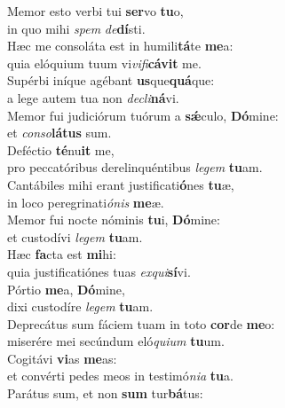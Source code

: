 \oddverse Memor esto verbi tui \textbf{ser}vo \textbf{tu}o,~\*\\
\oddverse in quo mihi \textit{spem} \textit{de}\textbf{dí}sti.\\
\evenverse Hæc me consoláta est in humili\textbf{tá}te \textbf{me}a:~\*\\
\evenverse quia elóquium tuum vi\textit{vi}\textit{fi}\textbf{cá}\textbf{vit} me.\\
\oddverse Supérbi iníque agébant \textbf{us}que\textbf{quá}que:~\*\\
\oddverse a lege autem tua non \textit{de}\textit{cli}\textbf{ná}vi.\\
\evenverse Memor fui judiciórum tuórum a \textbf{sǽ}culo, \textbf{Dó}mine:~\*\\
\evenverse et \textit{con}\textit{so}\textbf{lá}\textbf{tus} sum.\\
\oddverse Deféctio \textbf{té}nu\textbf{it} me,~\*\\
\oddverse pro peccatóribus derelinquéntibus \textit{le}\textit{gem} \textbf{tu}am.\\
\evenverse Cantábiles mihi erant justificati\textbf{ó}nes \textbf{tu}æ,~\*\\
\evenverse in loco peregrinati\textit{ó}\textit{nis} \textbf{me}æ.\\
\oddverse Memor fui nocte nóminis \textbf{tu}i, \textbf{Dó}mine:~\*\\
\oddverse et custodívi \textit{le}\textit{gem} \textbf{tu}am.\\
\evenverse Hæc \textbf{fa}cta est \textbf{mi}hi:~\*\\
\evenverse quia justificatiónes tuas \textit{ex}\textit{qui}\textbf{sí}vi.\\
\oddverse Pórtio \textbf{me}a, \textbf{Dó}mine,~\*\\
\oddverse dixi custodíre \textit{le}\textit{gem} \textbf{tu}am.\\
\evenverse Deprecátus sum fáciem tuam in toto \textbf{cor}de \textbf{me}o:~\*\\
\evenverse miserére mei secúndum eló\textit{qui}\textit{um} \textbf{tu}um.\\
\oddverse Cogitávi \textbf{vi}as \textbf{me}as:~\*\\
\oddverse et convérti pedes meos in testimó\textit{ni}\textit{a} \textbf{tu}a.\\
\evenverse Parátus sum, et non \textbf{sum} tur\textbf{bá}tus:~\*\\
